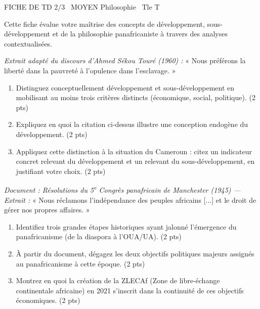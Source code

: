 \documentclass[11pt]{article}
\begin{document}
\begin{tcolorbox}[enhanced,colback=popink,colframe=popink,arc=10pt,boxrule=0pt,left=12pt,right=12pt,top=9pt,bottom=9pt]
{\color{white}\popxbold\small FICHE DE TD 2/3 \textbullet\ MOYEN \hfill Philosophie \textbullet\ Tle T\par}
\end{tcolorbox}
\vspace{4pt}
\noindent Cette fiche évalue votre maîtrise des concepts de développement, sous-développement et de la philosophie panafricaniste à travers des analyses contextualisées.

\begin{exercice}
    \textit{Extrait adapté du discours d'Ahmed Sékou Touré (1960) :} « Nous préférons la liberté dans la pauvreté à l'opulence dans l'esclavage. »
    \begin{enumerate}
        \item Distinguez conceptuellement \og développement \fg{} et \og sous-développement \fg{} en mobilisant au moins trois critères distincts (économique, social, politique). (2 pts)
        \item Expliquez en quoi la citation ci-dessus illustre une conception \og endogène \fg{} du développement. (2 pts)
        \item Appliquez cette distinction à la situation du Cameroun : citez un indicateur concret relevant du développement et un relevant du sous-développement, en justifiant votre choix. (2 pts)
    \end{enumerate}
\end{exercice}

\begin{exercice}
    \textit{Document : Résolutions du 5\textsuperscript{e} Congrès panafricain de Manchester (1945) — Extrait :} « Nous réclamons l'indépendance des peuples africains [...] et le droit de gérer nos propres affaires. »
    \begin{enumerate}
        \item Identifiez trois grandes étapes historiques ayant jalonné l'émergence du panafricanisme (de la diaspora à l'OUA/UA). (2 pts)
        \item À partir du document, dégagez les deux objectifs politiques majeurs assignés au panafricanisme à cette époque. (2 pts)
        \item Montrez en quoi la création de la ZLECAf (Zone de libre-échange continentale africaine) en 2021 s'inscrit dans la continuité de ces objectifs économiques. (2 pts)
    \end{enumerate}
\end{exercice}
\end{document}
